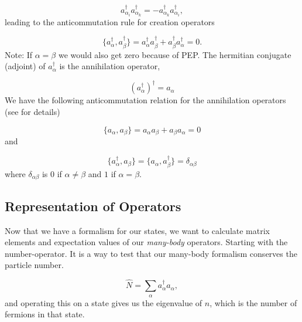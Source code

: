 \begin{equation}
a_{\alpha_i}^\dagger a_{\alpha_k}^\dagger = - a_{\alpha_k}^\dagger a_{\alpha_i}^\dagger,
 \label{eq:creationcommute}
\end{equation}
%
leading to the anticommutation rule for creation operators

\begin{equation}
\{a_{\alpha}^\dagger ,a_{\beta}^\dagger \} = a_{\alpha}^\dagger a_{\beta}^\dagger  + a_{\beta}^\dagger a_{\alpha}^\dagger = 0.
 \label{eq:creationanticommute}
\end{equation}
%
Note: If $\alpha = \beta$ we would also get zero because of PEP. The hermitian conjugate (adjoint) of $a_{\alpha}^\dagger$ is the annihilation operator,

\begin{equation}
\left(a_{\alpha}^\dagger \right)^\dagger = a_\alpha
 \label{def:creationadjoint]}
\end{equation}
%
We have the following anticommutation relation for the annihilation operators (see \cite{bartlett} for details)

\begin{equation}
\{a_\alpha, a_\beta \} = a_\alpha a_\beta + a_\beta a_\alpha = 0
 \label{eq:annihilationanticommute}
\end{equation}
%
and 

\begin{equation}
\{a_{\alpha}^\dagger, a_\beta \} = \{a_{\alpha}, a_\beta^\dagger \}  = \delta_{\alpha \beta}
 \label{eq:creationannihilationanticommute}
\end{equation}
%
where $\delta_{\alpha \beta}$ is $0$ if $\alpha \neq \beta$ and $1$ if $\alpha = \beta$.

\subsection{Representation of Operators}
Now that we have a formalism for our states, we want to calculate matrix elements and expectation values of our \emph{many-body} operators. Starting with the number-operator. It is a way to test that our many-body formalism conserves the particle number. 

\begin{equation}
\hat{N} = \sum_\alpha a_{\alpha}^\dagger a_{\alpha},
 \label{def:numberoperator}
\end{equation}
%
and operating this on a state gives us the eigenvalue of $n$, which is the number of fermions in that state.

